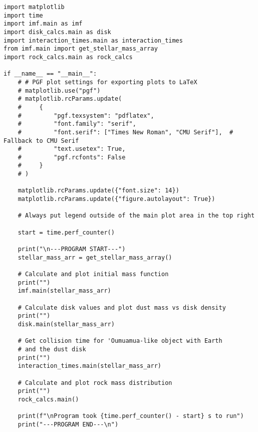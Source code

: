 \begin{lstlisting}
import matplotlib
import time
import imf.main as imf
import disk_calcs.main as disk
import interaction_times.main as interaction_times
from imf.main import get_stellar_mass_array
import rock_calcs.main as rock_calcs

if __name__ == "__main__":
    # # PGF plot settings for exporting plots to LaTeX
    # matplotlib.use("pgf")
    # matplotlib.rcParams.update(
    #     {
    #         "pgf.texsystem": "pdflatex",
    #         "font.family": "serif",
    #         "font.serif": ["Times New Roman", "CMU Serif"],  #  Fallback to CMU Serif
    #         "text.usetex": True,
    #         "pgf.rcfonts": False
    #     }
    # )

    matplotlib.rcParams.update({"font.size": 14})
    matplotlib.rcParams.update({"figure.autolayout": True})

    # Always put legend outside of the main plot area in the top right

    start = time.perf_counter()

    print("\n---PROGRAM START---")
    stellar_mass_arr = get_stellar_mass_array()

    # Calculate and plot initial mass function
    print("")
    imf.main(stellar_mass_arr)

    # Calculate disk values and plot dust mass vs disk density
    print("")
    disk.main(stellar_mass_arr)

    # Get collision time for 'Oumuamua-like object with Earth
    # and the dust disk
    print("")
    interaction_times.main(stellar_mass_arr)

    # Calculate and plot rock mass distribution
    print("")
    rock_calcs.main()

    print(f"\nProgram took {time.perf_counter() - start} s to run")
    print("---PROGRAM END---\n")
\end{lstlisting}